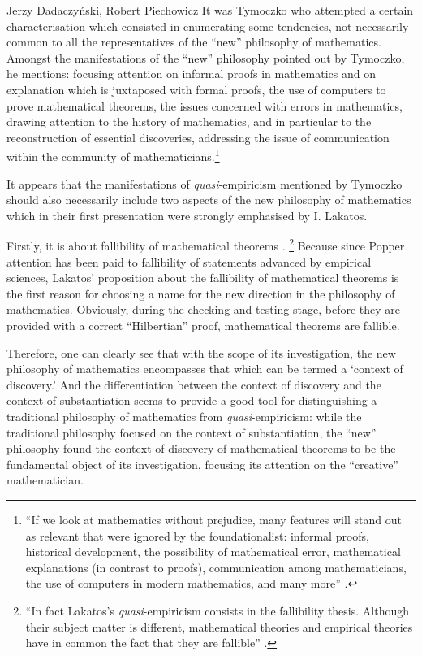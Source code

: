 \begin{artengenv}{Jerzy Dadaczyński, Robert Piechowicz}
It was Tymoczko who attempted a certain characterisation which consisted in enumerating some tendencies, not necessarily common to all the representatives of the ``new'' philosophy of mathematics. Amongst the manifestations of the ``new'' philosophy pointed out by Tymoczko, he mentions: focusing attention on informal proofs in mathematics and on explanation which is juxtaposed with formal proofs, the use of computers to prove mathematical theorems, the issues concerned with errors in mathematics, drawing attention to the history of mathematics, and in particular to the reconstruction of essential discoveries, addressing the issue of communication within the community of mathematicians.\footnote{``If we look at mathematics without prejudice, many features will stand out as relevant that were ignored by the foundationalist: informal proofs, historical development, the possibility of mathematical error, mathematical explanations (in contrast to proofs), communication among mathematicians, the use of computers in modern mathematics, and many more''
\parencite[][p.xvi]{tymoczko_introduction_1986}.%
}

It appears that the manifestations of \textit{quasi}-empiricism mentioned by Tymoczko should also necessarily include two aspects of the new philosophy of mathematics which in their first presentation were strongly emphasised by I. Lakatos.

Firstly, it is about fallibility of mathematical theorems
\parencite[][p.139]{lakatos_proofs_1976}.%
\footnote{``In fact Lakatos's \textit{quasi}-empiricism consists in the fallibility thesis. Although their subject matter is different, mathematical theories and empirical theories have in common the fact that they are fallible'' 
\parencite[][p.4]{koetsier_lakatos_1991}.%
} Because since Popper attention has been paid to fallibility of statements advanced by empirical sciences, Lakatos' proposition about the fallibility of mathematical theorems is the first reason for choosing a name for the new direction in the philosophy of mathematics. Obviously, during the checking and testing stage, before they are provided with a correct ``Hilbertian'' proof, mathematical theorems are fallible.

Therefore, one can clearly see that with the scope of its investigation, the new philosophy of mathematics encompasses that which can be termed a ‘context of discovery.' And the differentiation between the context of discovery and the context of substantiation seems to provide a good tool for distinguishing a traditional philosophy of mathematics from \textit{quasi}-empiricism: while the traditional philosophy focused on the context of substantiation, the ``new'' philosophy found the context of discovery of mathematical theorems to be the fundamental object of its investigation, focusing its attention on the ``creative'' mathematician.


\end{artengenv}
